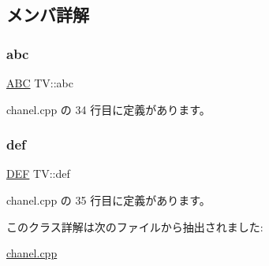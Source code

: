 \subsection{メンバ詳解}
\mbox{\label{class_t_v_a7bb8008571c1ca7539e937252503889b}} 
\subsubsection{\texorpdfstring{abc}{abc}}
{\footnotesize\ttfamily \hyperlink{class_a_b_c}{A\+BC} T\+V\+::abc\hspace{0.3cm}{\ttfamily [private]}}



 chanel.\+cpp の 34 行目に定義があります。

\mbox{\label{class_t_v_ab5e13d7d33ed800b78ddb755b11b7fa2}} 
\subsubsection{\texorpdfstring{def}{def}}
{\footnotesize\ttfamily \hyperlink{class_d_e_f}{D\+EF} T\+V\+::def\hspace{0.3cm}{\ttfamily [private]}}



 chanel.\+cpp の 35 行目に定義があります。



このクラス詳解は次のファイルから抽出されました\+:\begin{DoxyCompactItemize}
\item 
\hyperlink{chanel_8cpp}{chanel.\+cpp}\end{DoxyCompactItemize}
